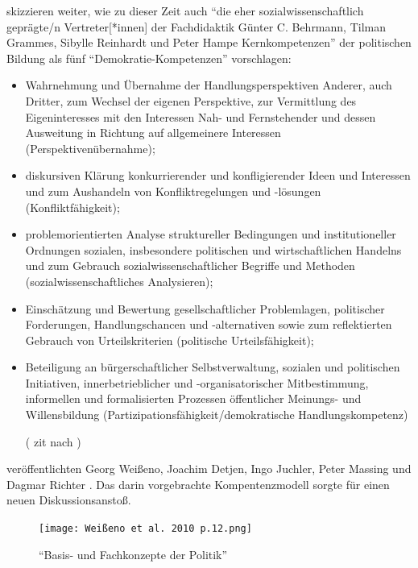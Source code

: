 \textcite[106-107]{Gloe2020} skizzieren weiter, wie zu dieser Zeit auch 
\enquote{die eher sozialwissenschaftlich geprägte/n Vertreter[*innen] der Fachdidaktik Günter C. Behrmann, Tilman Grammes, Sibylle Reinhardt und Peter Hampe Kernkompetenzen} der politischen Bildung als fünf \enquote{Demokratie-Kompetenzen} vorschlagen:
\begin{itemize}
    \item Wahrnehmung und Übernahme der Handlungsperspektiven Anderer, auch Dritter, zum Wechsel der eigenen Perspektive, zur Vermittlung des Eigeninteresses mit den Interessen Nah- und Fernstehender und dessen Ausweitung in Richtung auf allgemeinere Interessen (Perspektivenübernahme); 
    \item diskursiven Klärung konkurrierender und konfligierender Ideen und Interessen und zum Aushandeln von Konfliktregelungen und -lösungen (Konfliktfähigkeit); 
    \item problemorientierten Analyse struktureller Bedingungen und institutioneller Ordnungen sozialen, insbesondere politischen und wirtschaftlichen Handelns und zum Gebrauch sozialwissenschaftlicher Begriffe und Methoden (sozialwissenschaftliches Analysieren); 
    \item Einschätzung und Bewertung gesellschaftlicher Problemlagen, politischer Forderungen, Handlungschancen und -alternativen sowie zum reflektierten Gebrauch von Urteilskriterien (politische Urteilsfähigkeit); 
    \item Beteiligung an bürgerschaftlicher Selbstverwaltung, sozialen und politischen Initiativen, innerbetrieblicher und -organisatorischer Mitbestimmung, informellen und formalisierten Prozessen öffentlicher Meinungs- und Willensbildung (Partizipationsfähigkeit/demokratische Handlungskompetenz) 

    (\textcite[337 f.]{Behrmann.2004} \gls{zit} nach \textcite[106-107]{Gloe2020})
\end{itemize}
\citeyear{weißeno.2010} veröffentlichten Georg Weißeno, Joachim Detjen, Ingo Juchler, Peter Massing und Dagmar Richter . Das darin vorgebrachte Kompentenzmodell %
sorgte für einen neuen Diskussionsanstoß. 
\begin{figure}[htb]
    \centering
    \texttt{[image: Weißeno et al. 2010 p.12.png]}
    \caption{\enquote{Basis- und Fachkonzepte der Politik} \autocite[12]{weißeno.2010}}
    \label{2010kompMod}
\end{figure}
